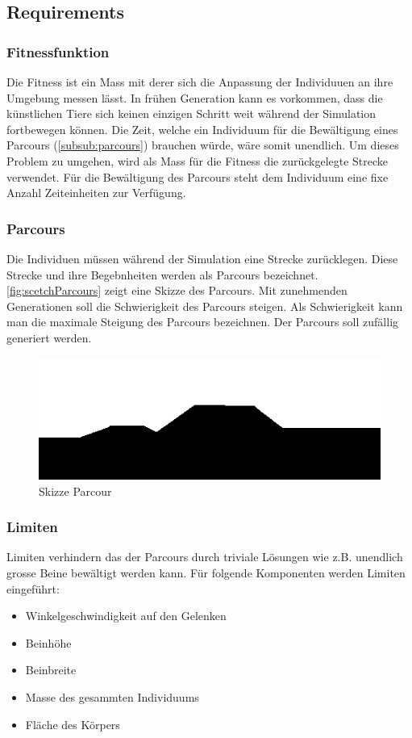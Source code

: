   \subsection{Requirements}

    \subsubsection{Fitnessfunktion}
      Die Fitness ist ein Mass mit derer sich die Anpassung der Individuuen an ihre Umgebung messen lässt.
      In frühen Generation kann es vorkommen, dass die künstlichen Tiere sich keinen einzigen Schritt weit während der Simulation
      fortbewegen können. Die Zeit, welche ein Individuum für die Bewältigung eines Parcours (\vref{subsub:parcours}) brauchen würde, wäre somit unendlich.
      Um dieses Problem zu umgehen, wird als Mass für die Fitness die zurückgelegte Strecke verwendet.
      Für die Bewältigung des Parcours steht dem Individuum eine fixe Anzahl Zeiteinheiten zur Verfügung.

    \subsubsection{Parcours\label{subsub:parcours}}
      Die Individuen müssen während der Simulation eine Strecke zurücklegen.
      Diese Strecke und ihre Begebnheiten werden als Parcours bezeichnet.
      \vref{fig:scetchParcours} zeigt eine Skizze des Parcours.
      Mit zunehmenden Generationen soll die Schwierigkeit des Parcours steigen.
      Als Schwierigkeit kann man die maximale Steigung des Parcours bezeichnen.
      Der Parcours soll zufällig generiert werden.

      \begin{figure}[H]
        \includegraphics[scale=1]{graphics/scetch_parcours}
        \caption{Skizze Parcour\label{fig:scetchParcours}}
      \end{figure}


    \subsubsection{Limiten}
      Limiten verhindern das der Parcours durch triviale Lösungen wie z.B. unendlich grosse Beine bewältigt werden kann.
      Für folgende Komponenten werden Limiten eingeführt:
      \begin{itemize}
        \item Winkelgeschwindigkeit auf den Gelenken
        \item Beinhöhe
        \item Beinbreite
        \item Masse des gesammten Individuums
        \item Fläche des Körpers
      \end{itemize}

